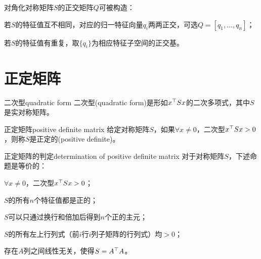 
对角化对称矩阵$S$的正交矩阵$Q$可被构造：
\begin{compactitem}
	\item 若$S$的特征值互不相同，对应的归一特征向量$q_i$两两正交，可选$Q=[q_1,\ldots,q_n]$；
	\item 若$S$的特征值有重复，取$\{q_i\}$为相应特征子空间的正交基。
\end{compactitem}
\section{正定矩阵}
\begin{definition}{二次型}{quadratic form}
	二次型(quadratic form)是形如$x^\top Sx$的二次多项式，其中$S$是实对称矩阵。
\end{definition}
\begin{definition}{正定矩阵}{positive definite matrix}
	给定对称矩阵$S$，如果$\forall x\neq 0$，二次型$x^\top Sx>0$，则称$S$是正定的(positive definite)。
\end{definition}
\begin{theorem}{正定矩阵的判定}{determination of positive definite matrix}
	对于对称矩阵$S$，下述命题是等价的：
	\begin{compactenum}
		\item $\forall x\neq 0$，二次型$x^\top Sx>0$；
		\item $S$的所有$n$个特征值都是正的；
		\item $S$可以只通过换行和倍加后得到$n$个正的主元；
		\item $S$的所有左上行列式（前$i$行$i$列子矩阵的行列式）均$>0$；
		\item 存在$A$列之间线性无关，使得$S=A^\top A$。
	\end{compactenum}
\end{theorem}
